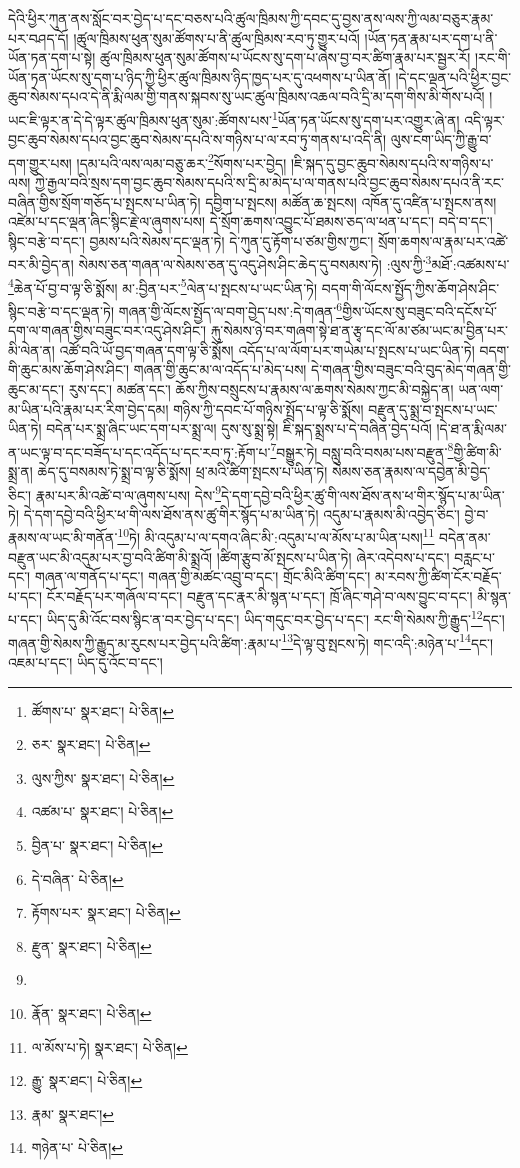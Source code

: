 དེའི་ཕྱིར་ཀུན་ནས་སློང་བར་བྱེད་པ་དང་བཅས་པའི་ཚུལ་ཁྲིམས་ཀྱི་དབང་དུ་བྱས་ནས་ལས་ཀྱི་ལམ་བཅུར་རྣམ་པར་བཤད་དོ། །ཚུལ་ཁྲིམས་ཕུན་སུམ་ཚོགས་པ་ནི་ཚུལ་ཁྲིམས་རབ་ཏུ་གྱུར་པའོ། །ཡོན་ཏན་རྣམ་པར་དག་པ་ནི་ཡོན་ཏན་དག་པ་སྟེ། ཚུལ་ཁྲིམས་ཕུན་སུམ་ཚོགས་པ་ཡོངས་སུ་དག་པ་ཞེས་བྱ་བར་ཚིག་རྣམ་པར་སྦྱར་རོ། །རང་གི་ཡོན་ཏན་ཡོངས་སུ་དག་པ་ཉིད་ཀྱི་ཕྱིར་ཚུལ་ཁྲིམས་ཉིད་ཁྱད་པར་དུ་འཕགས་པ་ཡིན་ནོ། །དེ་དང་ལྡན་པའི་ཕྱིར་བྱང་ཆུབ་སེམས་དཔའ་དེ་ནི་རྨི་ལམ་གྱི་གནས་སྐབས་སུ་ཡང་ཚུལ་ཁྲིམས་འཆལ་བའི་དྲི་མ་དག་གིས་མི་གོས་པའོ། །ཡང་ཇི་ལྟར་ན་དེ་དེ་ལྟར་ཚུལ་ཁྲིམས་ཕུན་སུམ་:ཚོགས་པས་\footnote{ཚོགས་པ་  སྣར་ཐང་།  པེ་ཅིན། }ཡོན་ཏན་ཡོངས་སུ་དག་པར་འགྱུར་ཞེ་ན། འདི་ལྟར་བྱང་ཆུབ་སེམས་དཔའ་བྱང་ཆུབ་སེམས་དཔའི་ས་གཉིས་པ་ལ་རབ་ཏུ་གནས་པ་འདི་ནི། ལུས་ངག་ཡིད་ཀྱི་རྒྱུ་བ་དག་གྱུར་པས། །དམ་པའི་ལས་ལམ་བཅུ་ཆར་\footnote{ཅར་  སྣར་ཐང་།  པེ་ཅིན། }སོགས་པར་བྱེད། །ཇི་སྐད་དུ་བྱང་ཆུབ་སེམས་དཔའི་ས་གཉིས་པ་ལས། ཀྱེ་རྒྱལ་བའི་སྲས་དག་བྱང་ཆུབ་སེམས་དཔའི་ས་དྲི་མ་མེད་པ་ལ་གནས་པའི་བྱང་ཆུབ་སེམས་དཔའ་ནི་རང་བཞིན་གྱིས་སྲོག་གཅོད་པ་སྤངས་པ་ཡིན་ཏེ། དབྱིག་པ་སྤངས། མཚོན་ཆ་སྤངས། འཁོན་དུ་འཛིན་པ་སྤངས་ནས། འཛེམ་པ་དང་ལྡན་ཞིང་སྙིང་རྗེ་ལ་ཞུགས་པས། དེ་སྲོག་ཆགས་འབྱུང་པོ་ཐམས་ཅད་ལ་ཕན་པ་དང་། བདེ་བ་དང་། སྙིང་བརྩེ་བ་དང་། བྱམས་པའི་སེམས་དང་ལྡན་ཏེ། དེ་ཀུན་དུ་རྟོག་པ་ཙམ་གྱིས་ཀྱང་། སྲོག་ཆགས་ལ་རྣམ་པར་འཚེ་བར་མི་བྱེད་ན། སེམས་ཅན་གཞན་ལ་སེམས་ཅན་དུ་འདུ་ཤེས་ཤིང་ཆེད་དུ་བསམས་ཏེ། :ལུས་ཀྱི་\footnote{ལུས་ཀྱིས་  སྣར་ཐང་།  པེ་ཅིན། }མཐོ་:འཚམས་པ་\footnote{འཚམ་པ་  སྣར་ཐང་།  པེ་ཅིན། }ཆེན་པོ་བྱ་བ་ལྟ་ཅི་སྨོས། མ་:བྱིན་པར་\footnote{བྱིན་པ་  སྣར་ཐང་།  པེ་ཅིན། }ལེན་པ་སྤངས་པ་ཡང་ཡིན་ཏེ། བདག་གི་ལོངས་སྤྱོད་ཀྱིས་ཆོག་ཤེས་ཤིང་སྙིང་བརྩེ་བ་དང་ལྡན་ཏེ། གཞན་གྱི་ལོངས་སྤྱོད་ལ་བག་བྱེད་པས་:དེ་གཞན་\footnote{དེ་བཞིན་  པེ་ཅིན། }གྱིས་ཡོངས་སུ་བཟུང་བའི་དངོས་པོ་དག་ལ་གཞན་གྱིས་བཟུང་བར་འདུ་ཤེས་ཤིང་། རྐུ་སེམས་ཉེ་བར་གཞག་སྟེ་ཐ་ན་རྩྭ་དང་ལོ་མ་ཙམ་ཡང་མ་བྱིན་པར་མི་ལེན་ན། འཚོ་བའི་ཡོ་བྱད་གཞན་དག་ལྟ་ཅི་སྨོས། འདོད་པ་ལ་ལོག་པར་གཡེམ་པ་སྤངས་པ་ཡང་ཡིན་ཏེ། བདག་གི་ཆུང་མས་ཆོག་ཤེས་ཤིང་། གཞན་གྱི་ཆུང་མ་ལ་འདོད་པ་མེད་པས། དེ་གཞན་གྱིས་བཟུང་བའི་བུད་མེད་གཞན་གྱི་ཆུང་མ་དང་། རུས་དང་། མཚན་དང་། ཆོས་ཀྱིས་བསྲུངས་པ་རྣམས་ལ་ཆགས་སེམས་ཀྱང་མི་བསྐྱེད་ན། ཡན་ལག་མ་ཡིན་པའི་རྣམ་པར་རིག་བྱེད་དམ། གཉིས་ཀྱི་དབང་པོ་གཉིས་སྤྲོད་པ་ལྟ་ཅི་སྨོས། བརྫུན་དུ་སྨྲ་བ་སྤངས་པ་ཡང་ཡིན་ཏེ། བདེན་པར་སྨྲ་ཞིང་ཡང་དག་པར་སྨྲ་ལ། དུས་སུ་སྨྲ་སྟེ། ཇི་སྐད་སྨྲས་པ་དེ་བཞིན་བྱེད་པའོ། །དེ་ཐ་ན་རྨི་ལམ་ན་ཡང་ལྟ་བ་དང་བཟོད་པ་དང་འདོད་པ་དང་རབ་ཏུ་:རྟོག་པ་\footnote{རྟོགས་པར་  སྣར་ཐང་།  པེ་ཅིན། }བསྒྱུར་ཏེ། བསླུ་བའི་བསམ་པས་བརྫུན་\footnote{རྫུན་  སྣར་ཐང་།  པེ་ཅིན། }གྱི་ཚིག་མི་སྨྲ་ན། ཆེད་དུ་བསམས་ཏེ་སྨྲ་བ་ལྟ་ཅི་སྨོས། ཕྲ་མའི་ཚིག་སྤངས་པ་ཡིན་ཏེ། སེམས་ཅན་རྣམས་ལ་དབྱེན་མི་བྱེད་ཅིང་། རྣམ་པར་མི་འཚེ་བ་ལ་ཞུགས་པས། དེས་\footnote{}དེ་དག་དབྱེ་བའི་ཕྱིར་ཚུ་གི་ལས་ཐོས་ནས་ཕ་གིར་སྙོད་པ་མ་ཡིན་ཏེ། དེ་དག་དབྱེ་བའི་ཕྱིར་ཕ་གི་ལས་ཐོས་ནས་ཚུ་གིར་སྙོད་པ་མ་ཡིན་ཏེ། འདུམ་པ་རྣམས་མི་འབྱེད་ཅིང་། བྱེ་བ་རྣམས་ལ་ཡང་མི་གནོན་\footnote{རྣོན་  སྣར་ཐང་།  པེ་ཅིན། }ཏེ། མི་འདུམ་པ་ལ་དགའ་ཞིང་མི་:འདུམ་པ་ལ་མོས་པ་མ་ཡིན་པས།\footnote{ལ་མོས་པ་ཏེ།  སྣར་ཐང་།  པེ་ཅིན། } བདེན་ནམ་བརྫུན་ཡང་མི་འདུམ་པར་བྱ་བའི་ཚིག་མི་སྨྲའོ། །ཚིག་རྩུབ་མོ་སྤངས་པ་ཡིན་ཏེ། ཞེར་འདེབས་པ་དང་། བརླང་པ་དང་། གཞན་ལ་གནོད་པ་དང་། གཞན་གྱི་མཚང་འབྲུ་བ་དང་། གྲོང་མིའི་ཚིག་དང་། མ་རབས་ཀྱི་ཚིག་ངོར་བརྗོད་པ་དང་། ངོར་བརྗོད་པར་གཞོལ་བ་དང་། བརྫུན་དང་རྣར་མི་སྙན་པ་དང་། ཁྲོ་ཞིང་གཤེ་བ་ལས་བྱུང་བ་དང་། མི་སྙན་པ་དང་། ཡིད་དུ་མི་འོང་བས་སྙིང་ན་བར་བྱེད་པ་དང་། ཡིད་གདུང་བར་བྱེད་པ་དང་། རང་གི་སེམས་ཀྱི་རྒྱུད་\footnote{རྒྱུ་  སྣར་ཐང་།  པེ་ཅིན། }དང་། གཞན་གྱི་སེམས་ཀྱི་རྒྱུད་མ་རུངས་པར་བྱེད་པའི་ཚིག་:རྣམ་པ་\footnote{རྣམ་  སྣར་ཐང་། }དེ་ལྟ་བུ་སྤངས་ཏེ། གང་འདི་:མཉེན་པ་\footnote{གཉེན་པ་  པེ་ཅིན། }དང་། འཇམ་པ་དང་། ཡིད་དུ་འོང་བ་དང་། 